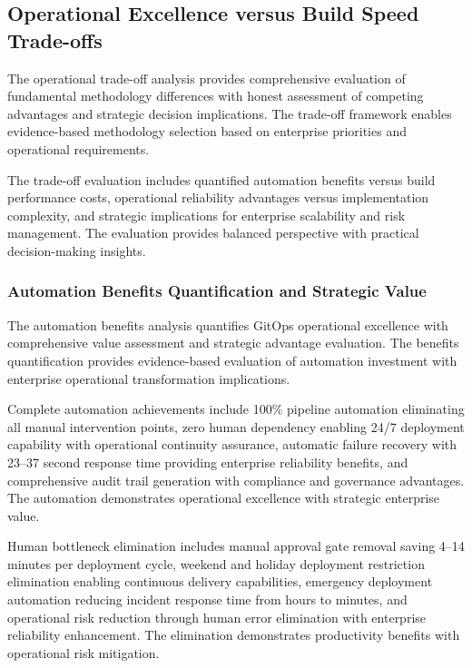 
\subsection{Operational Excellence versus Build Speed Trade-offs}
\label{subsec:operational_tradeoffs}

The operational trade-off analysis provides comprehensive evaluation of fundamental methodology differences with honest assessment of competing advantages and strategic decision implications. The trade-off framework enables evidence-based methodology selection based on enterprise priorities and operational requirements.

The trade-off evaluation includes quantified automation benefits versus build performance costs, operational reliability advantages versus implementation complexity, and strategic implications for enterprise scalability and risk management. The evaluation provides balanced perspective with practical decision-making insights.

\subsubsection{Automation Benefits Quantification and Strategic Value}

The automation benefits analysis quantifies GitOps operational excellence with comprehensive value assessment and strategic advantage evaluation. The benefits quantification provides evidence-based evaluation of automation investment with enterprise operational transformation implications.

Complete automation achievements include 100\% pipeline automation eliminating all manual intervention points, zero human dependency enabling 24/7 deployment capability with operational continuity assurance, automatic failure recovery with 23--37 second response time providing enterprise reliability benefits, and comprehensive audit trail generation with compliance and governance advantages. The automation demonstrates operational excellence with strategic enterprise value.

Human bottleneck elimination includes manual approval gate removal saving 4--14 minutes per deployment cycle, weekend and holiday deployment restriction elimination enabling continuous delivery capabilities, emergency deployment automation reducing incident response time from hours to minutes, and operational risk reduction through human error elimination with enterprise reliability enhancement. The elimination demonstrates productivity benefits with operational risk mitigation.


